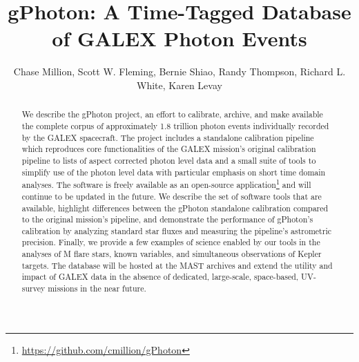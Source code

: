\documentclass[preprint]{aastex}
\begin{document}
\title{gPhoton: A Time-Tagged Database of GALEX Photon Events}

\author{
Chase Million,
Scott W. Fleming,
Bernie Shiao,
Randy Thompson,
Richard L. White,
Karen Levay}



\begin{abstract}
We describe the gPhoton project, an effort to calibrate, archive, and make available the complete corpus of approximately 1.8 trillion photon events individually recorded by the GALEX spacecraft. The project includes a standalone calibration pipeline which reproduces core functionalities of the GALEX mission's original calibration pipeline to lists of aspect corrected photon level data and a small suite of tools to simplify use of the photon level data with particular emphasis on short time domain analyses.  The software is freely available as an open-source application\footnote{\url{https://github.com/cmillion/gPhoton}} and will continue to be updated in the future.  We describe the set of software tools that are available, highlight differences between the gPhoton standalone calibration compared to the original mission's pipeline, and demonstrate the performance of gPhoton's calibration by analyzing standard star fluxes and measuring the pipeline's astrometric precision.  Finally, we provide a few examples of science enabled by our tools in the analyses of M flare stars, known variables, and simultaneous observations of Kepler targets.  The database will be hosted at the MAST archives and extend the utility and impact of GALEX data in the absence of dedicated, large-scale, space-based, UV-survey missions in the near future.
\end{abstract}
\end{document}
